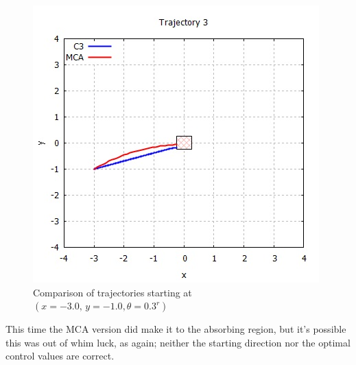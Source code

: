 \documentclass[11pt,draftd]{article}
\begin{document}
\begin{figure}[H]
	\centering
	\includegraphics[scale=0.65]{images/traj3.jpg}
	\caption{Comparison of trajectories starting at $  (x = -3.0,\, y = -1.0, \theta = 0.3^{r}) $}
\end{figure}
This time the MCA version did make it to the absorbing region, but it's possible this was out of whim luck, as again; neither the starting direction nor the optimal control values are correct.
\end{document}
